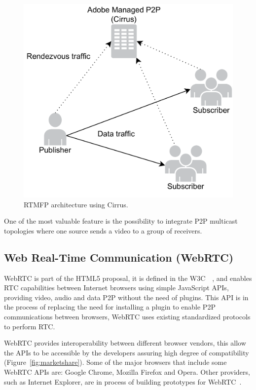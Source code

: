  \begin{figure}[h]
  \centering
    \includegraphics[scale=0.4]{./figures/cirrusAdobe.pdf}
      \caption[RTMFP architecture using Cirrus]{RTMFP architecture using Cirrus.}
	\label{fig:RTMFParchitecture}
\end{figure}
 
One of the most valuable feature is the possibility to integrate P2P multicast topologies where one source sends a video to a group of receivers.

\subsection{Web Real-Time Communication (WebRTC)}

WebRTC is part of the HTML5 proposal, it is defined in the W3C~\cite{webrtcW3cgroup}~\cite{getusermediaDraft}, and enables RTC capabilities between Internet browsers using simple JavaScript APIs, providing video, audio and data P2P without the need of plugins. This API is in the process of replacing the need for installing a plugin to enable P2P communications between browsers, WebRTC uses existing standardized protocols to perform RTC. 


WebRTC provides interoperability between different browser vendors, this allow the APIs to be accessible by the developers assuring high degree of compatibility (Figure~\ref{fig:marketshare}). Some of the major browsers that include some WebRTC APIs are: Google Chrome, Mozilla Firefox and Opera. Other providers, such as Internet Explorer, are in process of building prototypes for WebRTC~\cite{IEwebRTC}. 

